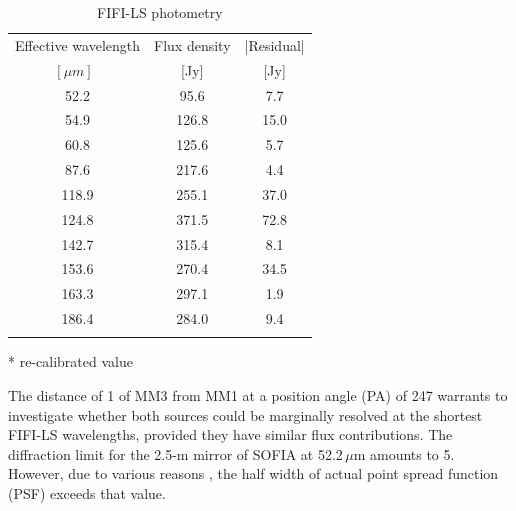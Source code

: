 \documentclass[longauth,usenatbib]{aa}
\begin{document}
\begin{table}
\begin{threeparttable}
\caption[]{FIFI-LS photometry}
         \label{fifiphot}
         \begin{tabular}{ccc}
            \hline
            \noalign{\smallskip}
            Effective wavelength      &  Flux density & |Residual| \\
            $[\mu m]$\ & [Jy] & [Jy] \\
            \noalign{\smallskip}
            \hline
            \noalign{\smallskip}
             52.2 &  95.6 &  7.7\\
             54.9 & 126.8 & 15.0\\
             60.8 & 125.6 &  5.7\\
             87.6 & 217.6 &  4.4\\
            118.9 & 255.1\tnote{*} & 37.0\\
            124.8 & 371.5 & 72.8\\
            142.7 & 315.4 &  8.1\\
            153.6 & 270.4 & 34.5\\
            163.3 & 297.1 &  1.9\\
            186.4 & 284.0 &  9.4\\
            \noalign{\smallskip}
            \hline
         \end{tabular}
         \begin{tablenotes}\footnotesize
\item[*] re-calibrated value
\end{tablenotes}
 \end{threeparttable}        
\end{table}
The distance of 1 of MM3 from MM1 at a position angle (PA) of 247\degr{} warrants to investigate whether both sources could be marginally resolved at the shortest FIFI-LS wavelengths, provided they have similar flux contributions. The
diffraction limit for the 2.5-m mirror of SOFIA at 52.2\,$\mu$m amounts to 5. However, due to various reasons , the half width of actual point spread function (PSF) exceeds that value. 
\end{document}
